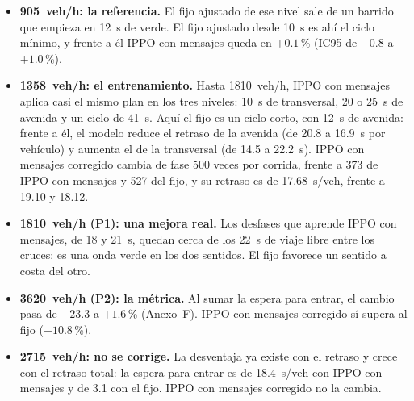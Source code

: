 \begin{itemize}
  \item \textbf{905~veh/h: la referencia.} El fijo ajustado de ese
    nivel sale de un barrido que empieza en 12~s de verde. El fijo
    ajustado desde 10~s es ahí el ciclo mínimo, y frente a él IPPO con
    mensajes queda en $+0.1$\,\% (IC95 de $-0.8$ a $+1.0$\,\%).
  \item \textbf{1358~veh/h: el entrenamiento.} Hasta 1810~veh/h, IPPO
    con mensajes aplica casi el mismo plan en los tres niveles: 10~s de
    transversal, 20 o 25~s de avenida y un ciclo de 41~s. Aquí el fijo
    es un ciclo corto, con 12~s de avenida: frente a él, el modelo
    reduce el retraso de la avenida (de 20.8 a 16.9~s por vehículo) y
    aumenta el de la transversal (de 14.5 a 22.2~s). IPPO con mensajes
    corregido cambia de fase 500 veces por corrida, frente a 373 de IPPO
    con mensajes y 527 del fijo, y su retraso es de 17.68~s/veh, frente
    a 19.10 y 18.12.
  \item \textbf{1810~veh/h (P1): una mejora real.} Los desfases que
    aprende IPPO con mensajes, de 18 y 21~s, quedan cerca de los 22~s
    de viaje libre entre los cruces: es una onda verde en los dos
    sentidos. El fijo favorece un sentido a costa del otro.
  \item \textbf{3620~veh/h (P2): la métrica.} Al sumar la espera para
    entrar, el cambio pasa de $-23.3$ a $+1.6$\,\% (Anexo~F). IPPO con
    mensajes corregido sí supera al fijo ($-10.8$\,\%).
  \item \textbf{2715~veh/h: no se corrige.} La desventaja ya existe con
    el retraso y crece con el retraso total: la espera para entrar es
    de 18.4~s/veh con IPPO con mensajes y de 3.1 con el fijo. IPPO con
    mensajes corregido no la cambia.
\end{itemize}

